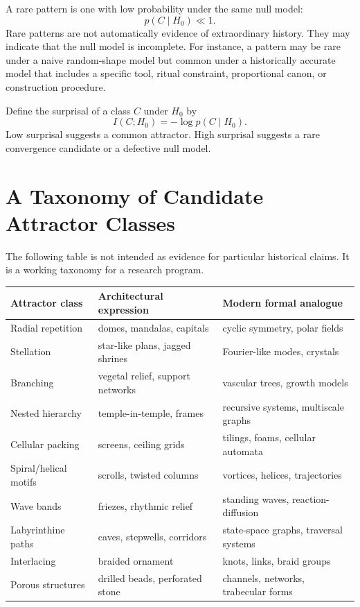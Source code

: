 \documentclass[11pt,a4paper]{article}
\begin{document}
A rare pattern is one with low probability under the same null model:
\begin{equation}
    p(C\mid H_0) \ll 1.
\end{equation}
Rare patterns are not automatically evidence of extraordinary history. They may indicate that the null model is incomplete. For instance, a pattern may be rare under a naive random-shape model but common under a historically accurate model that includes a specific tool, ritual constraint, proportional canon, or construction procedure.

Define the surprisal of a class $C$ under $H_0$ by
\begin{equation}
    I(C;H_0)=-\log p(C\mid H_0).
\end{equation}
Low surprisal suggests a common attractor. High surprisal suggests a rare convergence candidate or a defective null model.

\section{A Taxonomy of Candidate Attractor Classes}

The following table is not intended as evidence for particular historical claims. It is a working taxonomy for a research program.

\begin{center}
\begin{tabular}{p{3.2cm}p{4.4cm}p{5.2cm}}
\toprule
Attractor class & Architectural expression & Modern formal analogue \\
\midrule
Radial repetition & domes, mandalas, capitals & cyclic symmetry, polar fields \\
Stellation & star-like plans, jagged shrines & Fourier-like modes, crystals \\
Branching & vegetal relief, support networks & vascular trees, growth models \\
Nested hierarchy & temple-in-temple, frames & recursive systems, multiscale graphs \\
Cellular packing & screens, ceiling grids & tilings, foams, cellular automata \\
Spiral/helical motifs & scrolls, twisted columns & vortices, helices, trajectories \\
Wave bands & friezes, rhythmic relief & standing waves, reaction-diffusion \\
Labyrinthine paths & caves, stepwells, corridors & state-space graphs, traversal systems \\
Interlacing & braided ornament & knots, links, braid groups \\
Porous structures & drilled beads, perforated stone & channels, networks, trabecular forms \\
\bottomrule
\end{tabular}
\end{center}
\end{document}

